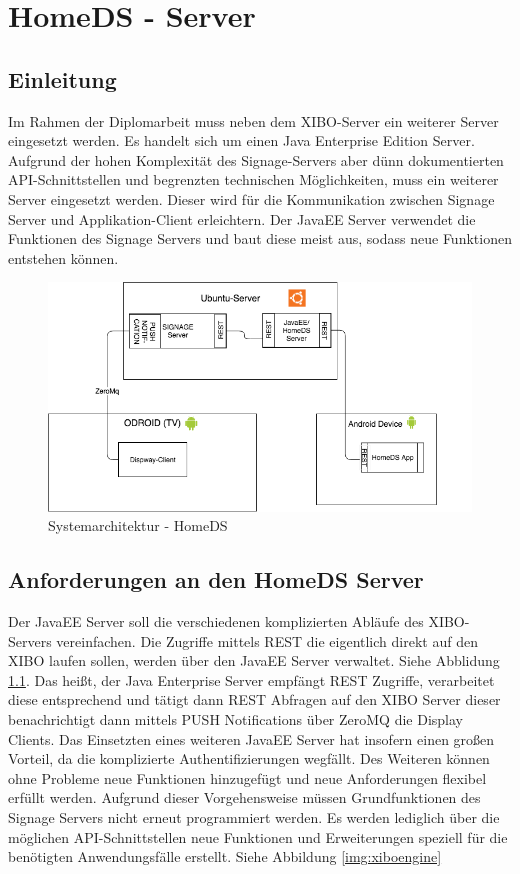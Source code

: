 \chapter{HomeDS - Server}
\section{Einleitung}\label{sec:einleitung}
Im Rahmen der Diplomarbeit muss neben dem XIBO-Server ein weiterer Server eingesetzt werden. Es handelt sich um einen Java Enterprise Edition Server. Aufgrund der hohen Komplexität des Signage-Servers aber dünn dokumentierten API-Schnittstellen und begrenzten technischen Möglichkeiten, muss ein weiterer Server eingesetzt werden. Dieser wird für die Kommunikation zwischen Signage Server und Applikation-Client erleichtern. Der JavaEE Server verwendet die Funktionen des Signage Servers und baut diese meist aus, sodass neue Funktionen entstehen können.

\begin{figure}[H]
\centering
\includegraphics[width=1\textwidth]{images/08_HomeDsWeb/SystemArch.png}
\caption{Systemarchitektur - HomeDS}
\label{img:systemarchitektur}
\end{figure}
 
\section{Anforderungen an den HomeDS Server}\label{sec:homeds}
Der JavaEE Server soll die verschiedenen komplizierten Abläufe des XIBO-Servers vereinfachen. Die Zugriffe mittels REST die eigentlich direkt auf den XIBO laufen sollen, werden über den JavaEE Server verwaltet. Siehe Abblidung \ref{img:systemarchitektur}. Das heißt, der Java Enterprise Server empfängt REST Zugriffe, verarbeitet diese entsprechend und tätigt dann REST Abfragen auf den XIBO Server dieser benachrichtigt dann mittels PUSH Notifications über ZeroMQ die Display Clients. Das Einsetzten eines weiteren JavaEE Server hat insofern einen großen Vorteil, da die komplizierte Authentifizierungen wegfällt. Des Weiteren können ohne Probleme neue Funktionen hinzugefügt und neue Anforderungen flexibel erfüllt werden. Aufgrund dieser Vorgehensweise müssen Grundfunktionen des Signage Servers nicht erneut programmiert werden. Es werden lediglich über die möglichen API-Schnittstellen neue Funktionen und Erweiterungen speziell für die benötigten Anwendungsfälle erstellt. Siehe Abbildung \ref{img:xiboengine}

